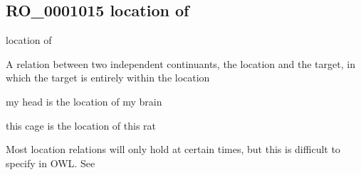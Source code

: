 \documentclass[letterpaper,10pt,english]{sphinxmanual}
\begin{document}
\begin{sphinxShadowBox}

\sphinxAtStartPar
{}
\end{sphinxShadowBox}
\begin{quote}

\ignorespaces \end{quote}


\subsection{RO\_0001015 \sphinxhyphen{} location of}
\label{\detokenize{doc-RO_0001015:ro-0001015-location-of}}\label{\detokenize{doc-RO_0001015:index-0}}\label{\detokenize{doc-RO_0001015::doc}}
\begin{sphinxShadowBox}

\sphinxAtStartPar
location of
\end{sphinxShadowBox}

\begin{sphinxShadowBox}

\sphinxAtStartPar
{}
\end{sphinxShadowBox}

\begin{sphinxShadowBox}

\sphinxAtStartPar
A relation between two independent continuants, the location and the target, in which the target is entirely within the location
\end{sphinxShadowBox}

\begin{sphinxShadowBox}

\sphinxAtStartPar
my head is the location of my brain

\sphinxAtStartPar
this cage is the location of this rat
\end{sphinxShadowBox}

\begin{sphinxShadowBox}

\sphinxAtStartPar
Most location relations will only hold at certain times, but this is difficult to specify in OWL. See 
\end{sphinxShadowBox}
\end{document}
